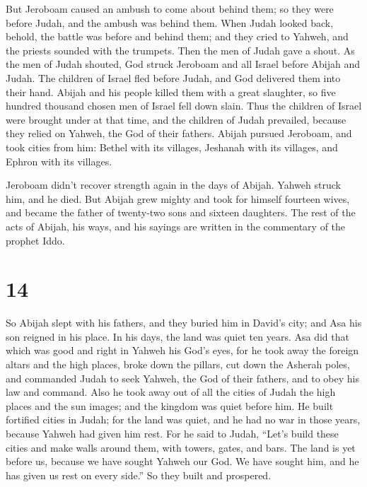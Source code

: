  But Jeroboam caused an ambush to come about behind them;
so they were before Judah, and the ambush was behind them.
 When Judah looked back, behold, the battle was before
and behind them; and they cried to Yahweh, and the priests sounded with
the trumpets.  Then the men of Judah gave a shout. As the
men of Judah shouted, God struck Jeroboam and all Israel before Abijah
and Judah.  The children of Israel fled before Judah, and
God delivered them into their hand.  Abijah and his
people killed them with a great slaughter, so five hundred thousand
chosen men of Israel fell down slain.  Thus the children
of Israel were brought under at that time, and the children of Judah
prevailed, because they relied on Yahweh, the God of their fathers.
 Abijah pursued Jeroboam, and took cities from him:
Bethel with its villages, Jeshanah with its villages, and Ephron with
its villages.

 Jeroboam didn't recover strength again in the days of
Abijah. Yahweh struck him, and he died.  But Abijah grew
mighty and took for himself fourteen wives, and became the father of
twenty-two sons and sixteen daughters.  The rest of the
acts of Abijah, his ways, and his sayings are written in the commentary
of the prophet Iddo.

\hypertarget{section-13}{%
\section{14}\label{section-13}}

 So Abijah slept with his fathers, and they buried him in
David's city; and Asa his son reigned in his place. In his days, the
land was quiet ten years.  Asa did that which was good and
right in Yahweh his God's eyes,  for he took away the
foreign altars and the high places, broke down the pillars, cut down the
Asherah poles,  and commanded Judah to seek Yahweh, the
God of their fathers, and to obey his law and command. 
Also he took away out of all the cities of Judah the high places and the
sun images; and the kingdom was quiet before him.  He
built fortified cities in Judah; for the land was quiet, and he had no
war in those years, because Yahweh had given him rest. 
For he said to Judah, ``Let's build these cities and make walls around
them, with towers, gates, and bars. The land is yet before us, because
we have sought Yahweh our God. We have sought him, and he has given us
rest on every side.'' So they built and prospered.

